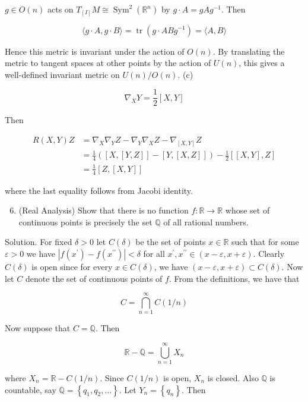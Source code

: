 \documentclass[10pt]{article}
\begin{document}
$g \in O(n)$ acts on $T_{[I]} M \cong \operatorname{Sym}^{2}\left(\mathbb{R}^{n}\right)$ by $g \cdot A=g A g^{-1}$. Then

$$
\langle g \cdot A, g \cdot B\rangle=\operatorname{tr}\left(g \cdot A B g^{-1}\right)=\langle A, B\rangle
$$

Hence this metric is invariant under the action of $O(n)$. By translating the metric to tangent spaces at other points by the action of $U(n)$, this gives a well-defined invariant metric on $U(n) / O(n)$.
(c)

$$
\nabla_{X} Y=\frac{1}{2}[X, Y]
$$

Then

$$
\begin{aligned}
R(X, Y) Z & =\nabla_{X} \nabla_{Y} Z-\nabla_{Y} \nabla_{X} Z-\nabla_{[X, Y]} Z \\
& =\frac{1}{4}([X,[Y, Z]]-[Y,[X, Z]])-\frac{1}{2}[[X, Y], Z] \\
& =\frac{1}{4}[Z,[X, Y]]
\end{aligned}
$$

where the last equality follows from Jacobi identity.

\begin{enumerate}
  \setcounter{enumi}{5}
  \item (Real Analysis) Show that there is no function $f: \mathbb{R} \rightarrow \mathbb{R}$ whose set of continuous points is precisely the set $\mathbb{Q}$ of all rational numbers.
\end{enumerate}

Solution. For fixed $\delta>0$ let $C(\delta)$ be the set of points $x \in \mathbb{R}$ such that for some $\varepsilon>0$ we have $\left|f\left(x^{\prime}\right)-f\left(x^{\prime \prime}\right)\right|<\delta$ for all $x^{\prime}, x^{\prime \prime} \in(x-\varepsilon, x+\varepsilon)$. Clearly $C(\delta)$ is open since for every $x \in C(\delta)$, we have $(x-\varepsilon, x+\varepsilon) \subset C(\delta)$. Now let $C$ denote the set of continuous points of $f$. From the definitions, we have that

$$
C=\bigcap_{n=1}^{\infty} C(1 / n)
$$

Now suppose that $C=\mathbb{Q}$. Then

$$
\mathbb{R}-\mathbb{Q}=\bigcup_{n=1}^{\infty} X_{n}
$$

where $X_{n}=\mathbb{R}-C(1 / n)$. Since $C(1 / n)$ is open, $X_{n}$ is closed. Also $\mathbb{Q}$ is countable, say $\mathbb{Q}=\left\{q_{1}, q_{2}, \ldots\right\}$. Let $Y_{n}=\left\{q_{n}\right\}$. Then
\end{document}
